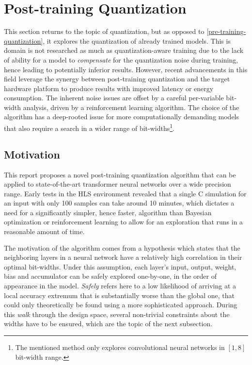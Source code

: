 \section{Post-training Quantization}\label{post-training-quantization}
This section returns to the topic of quantization, but as opposed to \cref{pre-training-quantization}, it explores the quantization of already trained models. This is domain is not researched as much as quantization-aware training due to the lack of ability for a model to \textit{compensate} for the quantization noise during training, hence leading to potentially inferior results. However, recent advancements in this field \cite{80-wang2019haq:} leverage the synergy between post-training quantization and the target hardware platform to produce results with improved latency or energy consumption. The inherent noise issues are offset by a careful per-variable bit-width analysis, driven by a reinforcement learning algorithm. The choice of the algorithm has a deep-rooted issue for more computationally demanding models that also require a search in a wider range of bit-widths\footnote{The mentioned method only explores convolutional neural networks in \([1, 8]\) bit-width range.}.

\subsection{Motivation}
This report proposes a novel post-training quantization algorithm that can be applied to state-of-the-art transformer neural networks over a wide precision range. Early tests in the HLS environment revealed that a single C simulation for an input with only 100 samples can take around 10 minutes, which dictates a need for a significantly simpler, hence faster, algorithm than Bayesian optimization or reinforcement learning to allow for an exploration that runs in a reasonable amount of time.

The motivation of the algorithm comes from a hypothesis which states that the neighboring layers in a neural network have a relatively high correlation in their optimal bit-widths. Under this assumption, each layer's input, output, weight, bias and accumulator can be safely explored one-by-one, in the order of appearance in the model. \textit{Safely} refers here to a low likelihood of arriving at a local accuracy extremum that is substantially worse than the global one, that could only theoretically be found using a more sophisticated approach. During this \textit{walk} through the design space, several non-trivial constraints about the widths have to be ensured, which are the topic of the next subsection.

